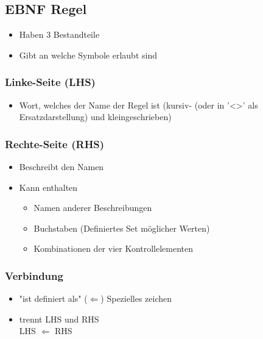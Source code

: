 \documentclass[11pt]{article}
\begin{document}
\subsection{EBNF Regel}
\label{sec:orgb32c77e}
\begin{itemize}
\item Haben 3 Bestandteile\\
\item Gibt an welche Symbole erlaubt sind\\
\end{itemize}

\subsubsection{Linke-Seite (LHS)}
\label{sec:orgf105570}
\begin{itemize}
\item Wort, welches der Name der Regel ist (kursiv- (oder in '<>' als Ersatzdarstellung) und  kleingeschrieben)\\
\end{itemize}
\subsubsection{Rechte-Seite (RHS)}
\label{sec:org0acaa0f}
\begin{itemize}
\item Beschreibt den Namen\\
\item Kann enthalten\\
\begin{itemize}
\item Namen anderer Beschreibungen\\
\item Buchstaben (Definiertes Set möglicher Werten)\\
\item Kombinationen der vier Kontrollelementen\\
\end{itemize}
\end{itemize}
\subsubsection{Verbindung}
\label{sec:org67d80ef}
\begin{itemize}
\item "ist definiert als" (\(\Leftarrow\)) Spezielles zeichen\\
\item trennt LHS und RHS\\
LHS \(\Leftarrow\) RHS\\
\end{itemize}
\end{document}
